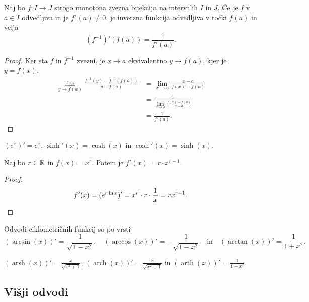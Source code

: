 \documentclass[12pt, a4paper]{article}
\begin{document}
\begin{izrek}
Naj bo $f\colon I\to J$ strogo monotona zvezna bijekcija na intervalih $I$ in $J$. Če je $f$ v $a\in I$ odvedljiva in je $f'(a)\ne 0$, je inverzna funkcija odvedljiva v točki $f(a)$ in velja
\[
\left(f^{-1}\right)'(f(a))=\frac{1}{f'(a)}.
\]
\end{izrek}

\begin{proof}
Ker sta $f$ in $f^{-1}$ zvezni, je $x\to a$ ekvivalentno $y\to f(a)$, kjer je $y=f(x)$.
\begin{align*}
\lim_{y\to f(a)}\frac{f^{-1}(y)-f^{-1}(f(a))}{y-f(a)}&=\lim_{x\to a}\frac{x-a}{f(x)-f(a)}
\\
&=\frac{1}{\displaystyle\lim_{x\to a}\frac{f(x)-f(a)}{x-a}}
\\
&=\frac{1}{f'(a)}.
\end{align*}
\end{proof}

\begin{posledica}
$(e^x)'=e^x$, $\sinh'(x)=\cosh(x)$ in $\cosh'(x)=\sinh(x)$.
\end{posledica}

\obvs

\begin{posledica}
Naj bo $r\in\mathbb{R}$ in $f(x)=x^r$. Potem je $f'(x)=r\cdot x^{r-1}$.
\end{posledica}

\begin{proof}
\[
f'(x)=(e^{r\ln x})'=x^r\cdot r\cdot\frac{1}{x}=rx^{r-1}.\qedhere
\]
\end{proof}

\begin{trditev}
Odvodi ciklometričnih funkcij so po vrsti
\[
(\arcsin(x))'=\frac{1}{\sqrt{1-x^2}},\quad (\arccos(x))'=-\frac{1}{\sqrt{1-x^2}}\quad\text{in}\quad (\arctan(x))'=\frac{1}{1+x^2}.
\]
\end{trditev}

\obvs

\begin{posledica}
$(\operatorname{arsh}(x))'=\frac{x}{\sqrt{x^2+1}}$, $(\operatorname{arch}(x))'=\frac{x}{\sqrt{x^2-1}}$ in $(\operatorname{arth}(x))'=\frac{1}{1-x^2}$.
\end{posledica}

\newpage

\subsection{Višji odvodi}
\end{document}
